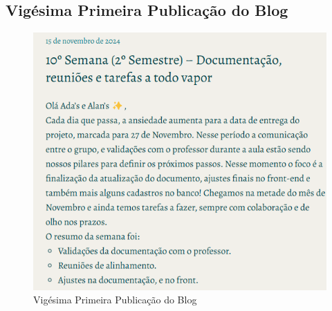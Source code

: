 \begin{apendicesenv}
\subsection*{Vigésima Primeira Publicação do Blog}
\begin{figure}[H]
    \centering
    \includegraphics[width=1.0\linewidth]{images/post21.png}
    \caption{Vigésima Primeira Publicação do Blog}
    \label{fig:decima primeira}
\end{figure}





\end{apendicesenv}
